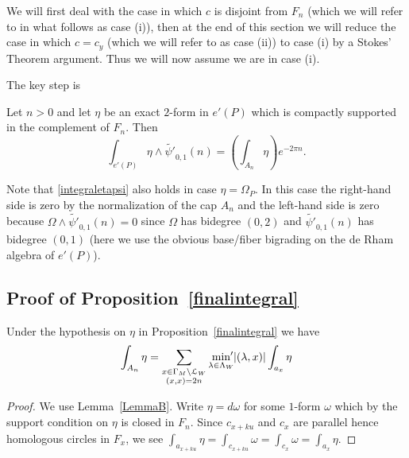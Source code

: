We will first deal with the case in which $c$ is disjoint from $F_n$ (which we will refer to in what follows as  case (i)), then at the end of this section  we will reduce the case in which $c=c_y$ (which we will refer to as case (ii)) to case (i) by a Stokes' Theorem argument.
Thus we will now assume we are in case (i).


The key step is 

\begin{proposition}\label{finalintegral}
Let $n>0$ and let $\eta$ be an exact $2$-form in $e'(P)$ which is compactly supported in the complement of $F_n$. Then 
\begin{equation}\label{integraletapsi}
 \int_{e'(P)} \eta \wedge \tilde{\psi'}_{0,1}(n) = \left(\int_{A_n} \eta\right) e^{ - 2 \pi n}. 
\end{equation}
\end{proposition}
\begin{remark}\label{youwillneedthis}
Note that \eqref{integraletapsi} also holds in case $\eta =\Omega_P$. In this case the right-hand side is zero by the normalization of the cap $A_n$ and the left-hand side is zero because $\Omega \wedge \tilde{\psi'}_{0,1}(n) =0$ since $\Omega$ has bidegree $(0,2)$
and $\tilde{\psi'}_{0,1}(n)$ has bidegree $(0,1)$ (here we use the obvious base/fiber bigrading on the de Rham algebra of $e'(P)$). 
\end{remark} 

\subsection{Proof of Proposition~\ref{finalintegral}}\label{8.2}


\begin{lemma}\label{LemmaA}
Under the hypothesis on $\eta$ in Proposition~\ref{finalintegral} we have
\[
 \int_{A_n} \eta = \sum_{ \substack{x\in \Gamma_M \backslash \mathcal{L}_W \\ (x,x)=2n}} \min_{\lambda \in \Lambda_W} {\hspace{-5pt}'} |(\lambda,x)| \int_{a_x} \eta
\]
\end{lemma}

\begin{proof}
We use Lemma~\ref{LemmaB}. Write $\eta = d \omega$ for some $1$-form $\omega$ which by the support condition on $\eta$ is closed in $F_n$. Since $c_{x+ku}$ and  $c_x$ are parallel hence homologous circles in $F_x$, we see $\int_{a_{x+ku}} \eta = \int_{c_{x+ku}} \omega = \int_{c_x} \omega = \int_{a_x} \eta$. 
\end{proof}


